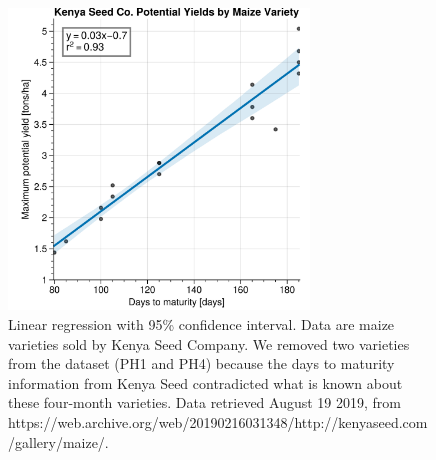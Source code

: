 
\begin{figure}%
\centering
\includegraphics[width=80mm]{fig3_ksc.png}
\caption{Linear regression with 95\% confidence interval. Data are maize varieties sold by Kenya Seed Company. We removed two varieties from the dataset (PH1 and PH4) because the days to maturity information from Kenya Seed contradicted what is known about these four-month varieties. Data retrieved August 19 2019, from https://web.archive.org/web/20190216031348/http://kenyaseed.com/gallery/maize/.}


\label{fig:ksc}
\end{figure}

